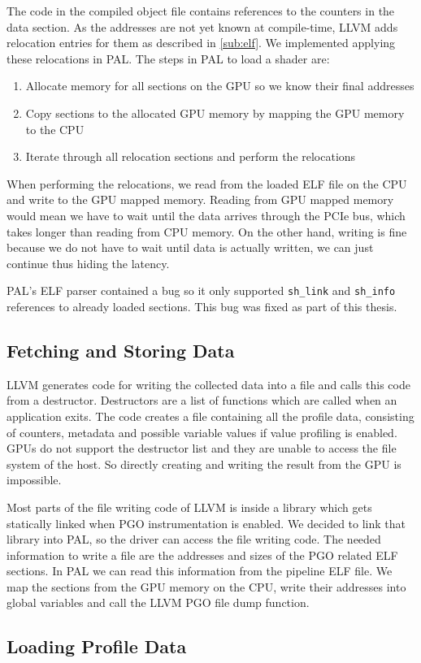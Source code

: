 The code in the compiled object file contains references to the counters in the data section. As the addresses are not yet known at compile-time, LLVM adds relocation entries for them as described in \cref{sub:elf}. We implemented applying these relocations in PAL. The steps in PAL to load a shader are:
\begin{enumerate}
	\item Allocate memory for all sections on the GPU so we know their final addresses
	\item Copy sections to the allocated GPU memory by mapping the GPU memory to the CPU
	\item Iterate through all relocation sections and perform the relocations
\end{enumerate}
When performing the relocations, we read from the loaded ELF file on the CPU and write to the GPU mapped memory. Reading from GPU mapped memory would mean we have to wait until the data arrives through the PCIe bus, which takes longer than reading from CPU memory. On the other hand, writing is fine because we do not have to wait until data is actually written, we can just continue thus hiding the latency.

PAL's ELF parser contained a bug so it only supported \texttt{sh\_link} and \texttt{sh\_info} references to already loaded sections. This bug was fixed as part of this thesis.


\subsection{Fetching and Storing Data}
\label{sub:save}
LLVM generates code for writing the collected data into a file and calls this code from a destructor. Destructors are a list of functions which are called when an application exits. The code creates a file containing all the profile data, consisting of counters, metadata and possible variable values if value profiling is enabled. GPUs do not support the destructor list and they are unable to access the file system of the host. So directly creating and writing the result from the GPU is impossible.

Most parts of the file writing code of LLVM is inside a library which gets statically linked when PGO instrumentation is enabled. We decided to link that library into PAL, so the driver can access the file writing code. The needed information to write a file are the addresses and sizes of the PGO related ELF sections. In PAL we can read this information from the pipeline ELF file. We map the sections from the GPU memory on the CPU, write their addresses into global variables and call the LLVM PGO file dump function.

\subsection{Loading Profile Data}
\label{sub:load}